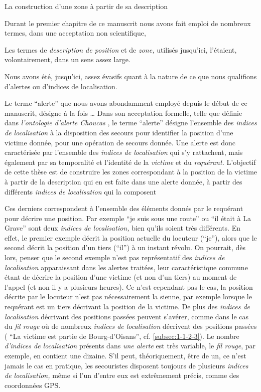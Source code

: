 
La construction d'une zone à partir de sa description 



Durant le premier chapitre de ce manuscrit nous avons fait emploi de
nombreux termes, dans une acceptation non scientifique, 

Les termes de \emph{description de position} et de \emph{zone,}
utilisés jusqu'ici, l'étaient, volontairement, dans un sens assez
large.


Nous avons été, jusqu'ici, assez évasifs quant à la nature de ce que
nous qualifions d'alertes ou d'indices de localisation.

Le terme \enquote{alerte} que nous avons abondamment employé depuis le
début de ce manuscrit, désigne à la fois …
%
Dans son acceptation formelle, telle que définie dans
\emph{l’ontologie d'alerte Choucas} \autocite[\ac{oac},][]{Viry2019},
le terme \enquote{alerte} désigne l'ensemble des \emph{indices de
  localisation} à la disposition des secours pour identifier la
position d'une victime donnée, pour une opération de secours
donnée. Une alerte est donc caractérisée par l'ensemble des
\emph{indices de localisation} qui s'y rattachent, mais également par
sa temporalité et l'identité de la \emph{victime} et du
\emph{requérant.}  L'objectif de cette thèse est de construire les
zones correspondant à la position de la victime à partir de la
description qui en est faite dans une alerte donnée, \ie à partir des
différents \emph{indices de localisation} qui la composent

Ces derniers correspondent à l'ensemble des éléments donnés par le
requérant pour décrire une position. Par exemple \enquote{je suis sous
  une route} ou \enquote{il était à La Grave} sont deux \emph{indices
  de localisation,} bien qu'ils soient très différents. En effet, le
premier exemple décrit la position actuelle du locuteur
(\enquote{je}), alors que le second décrit la position d'un tiers
(\enquote{il}) à un instant révolu. On pourrait, dès lors, penser que
le second exemple n'est pas représentatif des \emph{indices de
  localisation} apparaissant dans les alertes traitées, leur
caractéristique commune étant de décrire la position d'une victime (et
non d'un tiers) au moment de l'appel (et non il y a plusieurs
heures). Ce n'est cependant pas le cas, la position décrite par le
locuteur n'est pas nécessairement la sienne, par exemple lorsque le
requérant est un tiers décrivant la position de la victime. De plus
des \emph{indices de localisation} décrivant des positions passées
peuvent s'avérer, comme dans le cas du \emph{fil rouge} où de nombreux
\emph{indices de localisation} décrivent des positions passées (\eg
\enquote{La victime est partie de Bourg-d'Oisans},
cf. \autoref{subsec:1-1-2-3}). Le nombre \emph{d'indices de
  localisation} présents dans \emph{une alerte} est très variable, le
\emph{fil rouge}, par exemple, en contient une dizaine. S'il peut,
théoriquement, être de un, ce n'est jamais le cas en pratique, les
secouristes disposent toujours de plusieurs \emph{indices de
  localisation,} même si l'un d'entre eux est extrêmement précis,
comme des coordonnées GPS.
 
